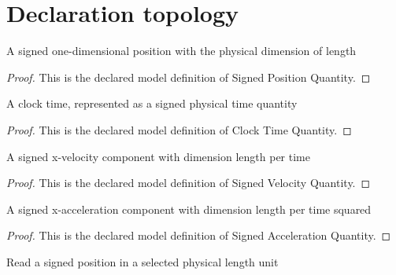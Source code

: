 \section{Declaration topology}
\begin{definition}
  \label{def:physics:phyx-mini-0830:phyxminiproblems-problemphyxmini0830-signedpositionquantity}
  A signed one-dimensional position with the physical dimension of length
\end{definition}
\begin{proof}
  This is the declared model definition of Signed Position Quantity.
\end{proof}
\begin{definition}
  \label{def:physics:phyx-mini-0830:phyxminiproblems-problemphyxmini0830-clocktimequantity}
  A clock time, represented as a signed physical time quantity
\end{definition}
\begin{proof}
  This is the declared model definition of Clock Time Quantity.
\end{proof}
\begin{definition}
  \label{def:physics:phyx-mini-0830:phyxminiproblems-problemphyxmini0830-signedvelocityquantity}
  A signed x-velocity component with dimension length per time
\end{definition}
\begin{proof}
  This is the declared model definition of Signed Velocity Quantity.
\end{proof}
\begin{definition}
  \label{def:physics:phyx-mini-0830:phyxminiproblems-problemphyxmini0830-signedaccelerationquantity}
  A signed x-acceleration component with dimension length per time squared
\end{definition}
\begin{proof}
  This is the declared model definition of Signed Acceleration Quantity.
\end{proof}
\begin{definition}
  \label{def:physics:phyx-mini-0830:phyxminiproblems-problemphyxmini0830-positionreadout}
  Read a signed position in a selected physical length unit
\end{definition}
